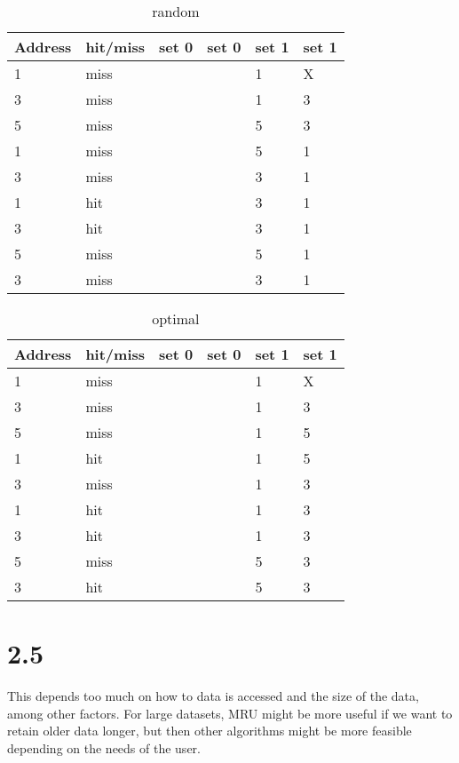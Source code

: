 \documentclass[10pt,a4paper]{article}
\begin{document}
\begin{table}[h]
	\centering
	\caption{random}
	\label{my-label}
	\begin{tabular}{|l|l|l|l|l|l|}
		\hline
		Address	& hit/miss  & set 0  & set 0  & set 1  & set 1  \\ \hline
		1&miss  &  &  &  1 & X  \\ \hline
		3& miss &  &  & 1 & 3  \\ \hline
		5& miss &  &  &  5& 3 \\ \hline
		1& miss &  &  &  5& 1 \\ \hline
		3& miss &  &  &  3& 1 \\ \hline
		1& hit &  &  & 3 &1  \\ \hline
		3&  hit&  &  & 3 & 1 \\ \hline
		5& miss &  &  & 5 & 1  \\ \hline
		3&  miss&  &  &  3& 1 \\ \hline
	\end{tabular}
\end{table}
\begin{table}[h]
	\centering
	\caption{optimal}
	\label{my-label}
	\begin{tabular}{|l|l|l|l|l|l|}
		\hline
		Address	& hit/miss  & set 0  & set 0  & set 1  & set 1  \\ \hline
		1&  miss&  &  &  1 & X  \\ \hline
		3& miss &  &  &  1&3  \\ \hline
		5& miss &  &  &  1&5  \\ \hline
		1& hit &  &  &  1& 5 \\ \hline
		3& miss &  &  &  1& 3 \\ \hline
		1& hit &  &  &  1&3  \\ \hline
		3& hit &  &  &  1&3  \\ \hline
		5&miss  &  &  &  5& 3 \\ \hline
		3& hit &  &  &  5& 3 \\ \hline
	\end{tabular}
\end{table}
\section*{2.5}
This depends too much on how to data is accessed and the size of the data, among other factors. For large datasets, MRU might be more useful if we want to retain older data longer, but then other algorithms might be more feasible depending on the needs of the user.
\end{document}
